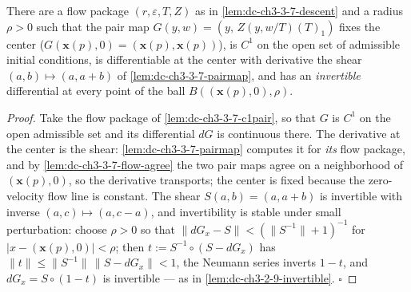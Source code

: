 \begin{lemma}
  \label{lem:dc-ch3-3-7-invertible}
  \leanok
  There are a flow package $(r,\varepsilon,T,Z)$ as in
  \cref{lem:dc-ch3-3-7-descent} and a radius $\rho>0$ such that the pair map
  $G(y,w)=(y,\,Z(y,w/T)(T)_1)$ fixes the center
  ($G(\mathbf{x}(p),0)=(\mathbf{x}(p),\mathbf{x}(p))$), is $C^1$ on the open
  set of admissible initial conditions, is differentiable at the center with
  derivative the shear $(a,b)\mapsto(a,a+b)$ of
  \cref{lem:dc-ch3-3-7-pairmap}, and has an \emph{invertible} differential at
  every point of the ball $B((\mathbf{x}(p),0),\rho)$.
\end{lemma}
\begin{proof}
  \leanok
  Take the flow package of \cref{lem:dc-ch3-3-7-c1pair}, so that $G$ is $C^1$
  on the open admissible set and its differential $dG$ is continuous there.
  The derivative at the center is the shear: \cref{lem:dc-ch3-3-7-pairmap}
  computes it for \emph{its} flow package, and by
  \cref{lem:dc-ch3-3-7-flow-agree} the two pair maps agree on a neighborhood
  of $(\mathbf{x}(p),0)$, so the derivative transports; the center is fixed
  because the zero-velocity flow line is constant. The shear $S(a,b)=(a,a+b)$
  is invertible with inverse $(a,c)\mapsto(a,c-a)$, and invertibility is
  stable under small perturbation: choose $\rho>0$ so that
  $\|dG_x-S\|<(\|S^{-1}\|+1)^{-1}$ for $|x-(\mathbf{x}(p),0)|<\rho$; then
  $t:=S^{-1}\circ(S-dG_x)$ has $\|t\|\le\|S^{-1}\|\,\|S-dG_x\|<1$, the
  Neumann series inverts $1-t$, and $dG_x=S\circ(1-t)$ is invertible — as in
  \cref{lem:dc-ch3-2-9-invertible}. $\square$
\end{proof}

